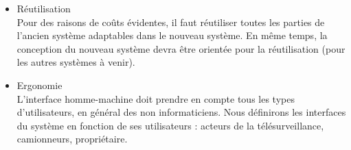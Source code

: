 \begin{itemize}
\item Réutilisation \\
Pour des raisons de coûts évidentes, il faut réutiliser toutes les parties de 
l'ancien système adaptables dans le nouveau système. En même temps, la conception 
du nouveau système devra être orientée pour la réutilisation (pour les autres systèmes à venir).

\item Ergonomie \\
L'interface homme-machine doit prendre en compte tous les types d'utilisateurs, 
en général des non informaticiens. Nous définirons les interfaces du système en 
fonction de ses utilisateurs : acteurs de la télésurveillance, camionneurs, propriétaire.

\end{itemize}
